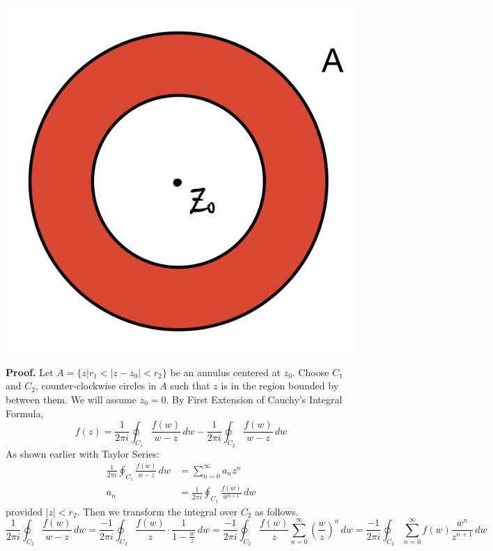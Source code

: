 \documentclass[11pt]{article}
\begin{document}
  \begin{minipage}{.5\textwidth}
    \centering
    \includegraphics[scale = 0.2]{Laurent}
\end{minipage} 
\newline
\newline
\textbf{Proof.}
Let $A = \{z|r_1 < |z - z_0| < r_2\}$ be an annulus centered at $z_0$. Choose $C_1$ and $C_2$, counter-clockwise circles in $A$ such that $z$ is in the region bounded by between them. We will assume $z_0 = 0$. By First Extension of Cauchy's Integral Formula,
$$f(z) = \frac{1}{2\pi i} \oint_{C_1} \frac{f(w)}{w - z} \,dw - \frac{1}{2\pi i} \oint_{C_2} \frac{f(w)}{w - z} \,dw$$
As shown earlier with Taylor Series: 
\begin{align*}
\frac{1}{2\pi i} \oint_{C_1} \frac{f(w)}{w - z} \,dw &= \sum_{n = 0}^{\infty} a_n z^n \\
a_n &= \frac{1}{2\pi i}\oint_{C_1} \frac{f(w)}{w^{n + 1}} \, dw
\end{align*}
provided $|z| < r_2$.
Then we transform the integral over $C_2$ as follows. 
$$\frac{1}{2\pi i}\oint_{C_2}\frac{f(w)}{w - z} \,dw = \frac{-1}{2\pi i}\oint_{C_2} \frac{f(w)}{z} \cdot \frac{1}{1 - \frac{w}{z}} \, dw = \frac{-1}{2\pi i}\oint_{C_2}\frac{f(w)}{z}\sum_{n = 0}^{\infty} \left(\frac{w}{z}\right)^n \, dw = \frac{-1}{2\pi i}\oint_{C_2}\sum_{n = 0}^{\infty} f(w)\frac{w^n}{z^{n + 1}} \, dw$$
\end{document}
